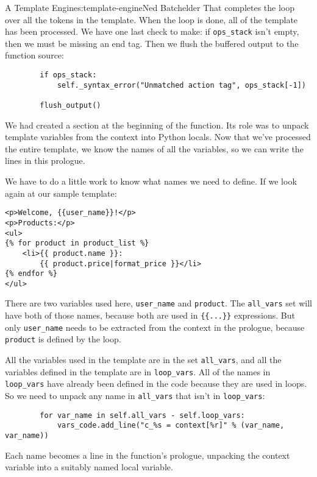 \begin{aosachapter}{A Template Engine}{s:template-engine}{Ned Batchelder}
That completes the loop over all the tokens in the template. When the
loop is done, all of the template has been processed. We have one last
check to make: if \texttt{ops\_stack} isn't empty, then we must be
missing an end tag. Then we flush the buffered output to the function
source:

\begin{verbatim}
        if ops_stack:
            self._syntax_error("Unmatched action tag", ops_stack[-1])

        flush_output()
\end{verbatim}

We had created a section at the beginning of the function. Its role was
to unpack template variables from the context into Python locals. Now
that we've processed the entire template, we know the names of all the
variables, so we can write the lines in this prologue.

We have to do a little work to know what names we need to define. If we
look again at our sample template:

\begin{verbatim}
<p>Welcome, {{user_name}}!</p>
<p>Products:</p>
<ul>
{% for product in product_list %}
    <li>{{ product.name }}:
        {{ product.price|format_price }}</li>
{% endfor %}
</ul>
\end{verbatim}

There are two variables used here, \texttt{user\_name} and
\texttt{product}. The \texttt{all\_vars} set will have both of those
names, because both are used in \texttt{\{\{...\}\}} expressions. But
only \texttt{user\_name} needs to be extracted from the context in the
prologue, because \texttt{product} is defined by the loop.

All the variables used in the template are in the set
\texttt{all\_vars}, and all the variables defined in the template are in
\texttt{loop\_vars}. All of the names in \texttt{loop\_vars} have
already been defined in the code because they are used in loops. So we
need to unpack any name in \texttt{all\_vars} that isn't in
\texttt{loop\_vars}:

\begin{verbatim}
        for var_name in self.all_vars - self.loop_vars:
            vars_code.add_line("c_%s = context[%r]" % (var_name, var_name))
\end{verbatim}

Each name becomes a line in the function's prologue, unpacking the
context variable into a suitably named local variable.


\end{aosachapter}
